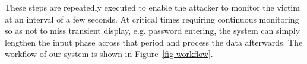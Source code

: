 These steps are repeatedly executed to enable the attacker to monitor the victim at an interval of a few seconds. At critical times requiring continuous monitoring so as not to miss transient display, e.g. password entering, the system can simply lengthen the input phase across that period and process the data afterwards. The workflow of our system is shown in Figure~\ref{fig-workflow}.

